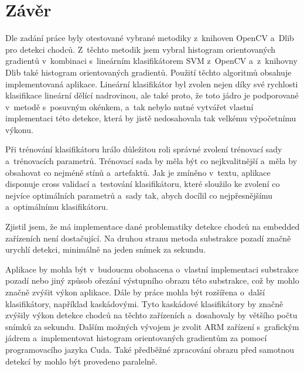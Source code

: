 \section{Závěr}
Dle zadání práce byly otestované vybrané metodiky z~knihoven OpenCV a~Dlib pro detekci chodců. Z~těchto metodik jsem vybral histogram orientovaných gradientů v~kombinaci s~lineárním klasifikátorem SVM z~OpenCV a~z~knihovny Dlib také histogram orientovaných gradientů. Použití těchto algoritmů obsahuje implementovaná aplikace. Lineární klasifikátor byl zvolen nejen díky své rychlosti klasifikace lineární dělící nadrovinou, ale také proto, že toto jádro je podporované v~metodě s~posuvným okénkem, a~tak nebylo nutné vytvářet vlastní implementaci této detekce, která by jistě nedosahovala tak velkému výpočetnímu výkonu. 

Při trénování klasifikátoru hrálo důležitou roli správné zvolení trénovací sady a~trénovacích parametrů. Trénovací sada by měla být co nejkvalitnější a~měla by obsahovat co nejméně stínů a~artefaktů. Jak je zmíněno v~textu, aplikace disponuje cross validací a~testování klasifikátoru, které sloužilo ke zvolení co nejvíce optimálních parametrů a~sady tak, abych docílil co nejpřesnějšímu a~optimálnímu klasifikátoru.

Zjistil jsem, že má implementace dané problematiky detekce chodců na embedded zařízeních není dostačující. Na druhou stranu metoda substrakce pozadí značně urychlí detekci, minimálně na jeden snímek za sekundu.

Aplikace by mohla být v~budoucnu obohacena o~vlastní implementaci substrakce pozadí nebo jiný způsob ořezání výstupního obrazu této substrakce, což by mohlo značně zvýšit výkon aplikace. Dále by práce mohla být rozšířena o~další klasifikátory, například kaskádovými. Tyto kaskádové klasifikátory by značně zvýšily výkon detekce chodců na těchto zařízeních a~dosahovaly by většího počtu snímků za sekundu. Dalším možných vývojem je zvolit ARM zařízení s~grafickým jádrem a~implementovat histogram orientovaných gradientům za pomocí programovacího jazyka Cuda. Také předběžné zpracování obrazu před samotnou detekcí by mohlo být provedeno paralelně.


